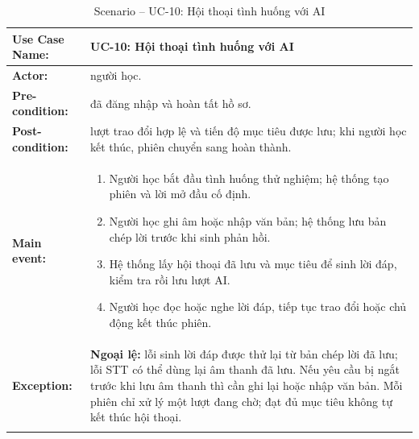 \documentclass[12pt,a4paper,oneside]{report}
\newenvironment{luongusecase}{%
    \begin{enumerate}[leftmargin=1.6em,topsep=0pt,itemsep=0.25em,parsep=0pt]
}{\end{enumerate}}
\begin{document}
\begingroup
\renewcommand{\arraystretch}{1.15}
\setlength{\LTpre}{0.4em}
\setlength{\LTpost}{0.6em}
\begin{longtable}{|>{\raggedright\arraybackslash\bfseries}p{}|p{}|}
\hline
Use Case Name: & UC-10: Hội thoại tình huống với AI \\
\hline
Actor: & người học. \\
\hline
Pre-condition: & đã đăng nhập và hoàn tất hồ sơ. \\
\hline
Post-condition: & lượt trao đổi hợp lệ và tiến độ mục tiêu được lưu; khi người học kết thúc, phiên chuyển sang hoàn thành. \\
\hline
Main event: & \begin{luongusecase}
\item Người học bắt đầu tình huống thử nghiệm; hệ thống tạo phiên và lời mở đầu cố định.
    \item Người học ghi âm hoặc nhập văn bản; hệ thống lưu bản chép lời trước khi sinh phản hồi.
    \item Hệ thống lấy hội thoại đã lưu và mục tiêu để sinh lời đáp, kiểm tra rồi lưu lượt AI.
    \item Người học đọc hoặc nghe lời đáp, tiếp tục trao đổi hoặc chủ động kết thúc phiên.
\end{luongusecase} \\
\hline
Exception: & \textbf{Ngoại lệ:} lỗi sinh lời đáp được thử lại từ bản chép lời đã lưu; lỗi STT có thể dùng lại âm thanh đã lưu. Nếu yêu cầu bị ngắt trước khi lưu âm thanh thì cần ghi lại hoặc nhập văn bản. Mỗi phiên chỉ xử lý một lượt đang chờ; đạt đủ mục tiêu không tự kết thúc hội thoại. \\
\hline
\caption{Scenario -- UC-10: Hội thoại tình huống với AI}\label{tab:uc-10}\\
\end{longtable}
\endgroup
\end{document}
